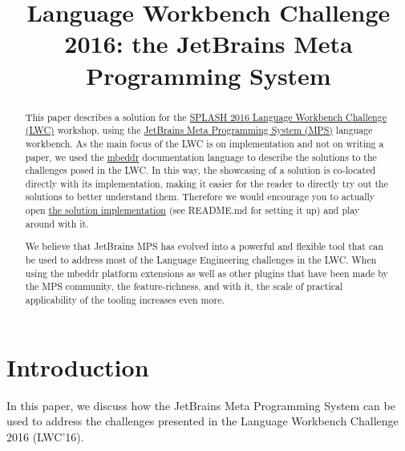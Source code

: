 \documentclass[preprint,numbers,10pt]{sigplanconf}
\begin{document}
\title{Language Workbench Challenge 2016: the JetBrains Meta Programming System}

\maketitle

\begin{abstract}
    This paper describes a solution for the \href{http://2016.splashcon.org/track/lwc2016}{SPLASH 2016 Language Workbench Challenge (LWC)} workshop, using the \href{https://www.jetbrains.com/mps/}{JetBrains Meta Programming System (MPS)} language workbench.
	As the main focus of the LWC is on implementation and not on writing a paper, we used the \href{http://mbeddr.com/}{mbeddr} documentation language to describe the solutions to the challenges posed in the LWC. In this way, the showcasing of a solution is co-located directly with its implementation, making it easier for the reader to directly try out the solutions to better understand them. Therefore we would encourage you to actually open \href{https://github.com/mps-lwc-16/mps-lwc-16}{the solution implementation} (see README.md for setting it up) and play around with it.

	We believe that JetBrains MPS has evolved into a powerful and flexible tool that can be used to address most of the Language Engineering challenges in the LWC. When using the mbeddr platform extensions as well as other plugins that have been made by the MPS community, the feature-richness, and with it, the scale of practical applicability of the tooling increases even more.
\end{abstract}
%
%

\section{Introduction}



In this paper, we discuss how the JetBrains Meta Programming System can be used to address the challenges presented in the Language Workbench
Challenge 2016 (LWC'16).
\end{document}
